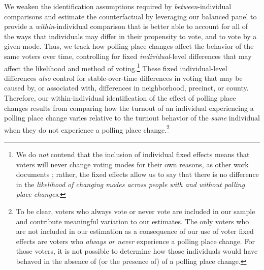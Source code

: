 \documentclass{cup_PSRM}
\begin{document}
We weaken the identification assumptions required by \emph{between}-individual comparisons and estimate the counterfactual by leveraging our balanced panel to provide a \emph{within}-individual comparison that is better able to account for all of the ways that individuals may differ in their propensity to vote, and to vote by a given mode.  Thus, we track how polling place changes affect the behavior of the same voters over time, controlling for fixed \emph{individual}-level differences that may affect the likelihood and method of voting.\footnote{We do \emph{not} contend that  the inclusion of individual fixed effects means that voters will never change voting modes for their own reasons, as other work documents \citep{stein1997}; rather, the fixed effects allow us to say that there is no difference in the \emph{likelihood of changing modes across people with and without polling place changes}.}  These fixed individual-level differences \emph{also} control for stable-over-time differences in voting that may be caused by, or associated with, differences in neighborhood, precinct, or county.  Therefore, our within-individual identification of the effect of polling place changes results from comparing how the turnout of an individual experiencing a polling place change varies relative to the turnout behavior of the \emph{same} individual when they do not experience a polling place change.\footnote{To be clear, voters who always vote or never vote are included in our sample and contribute meaningful variation to our estimates.  The only voters who are not included in our estimation as a consequence of our use of voter fixed effects are voters who \emph{always or never} experience a polling place change.  For those voters, it is not possible to determine how those individuals would have behaved in the absence of (or the presence of) of a polling place change.}
\end{document}
